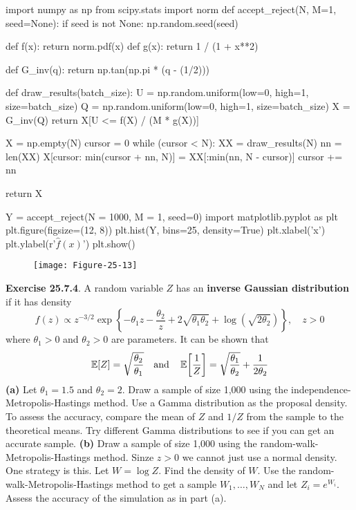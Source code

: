 \begin{python}
import numpy as np
from scipy.stats import norm
def accept_reject(N, M=1, seed=None):
    if seed is not None:
        np.random.seed(seed)
        
    def f(x):
        return norm.pdf(x)
    def g(x):
        return 1 / (1 + x**2)
    
    def G_{i}nv(q):
        return np.tan(np.pi * (q - (1/2)))
        
    def draw_results(batch_size): 
        U = np.random.uniform(low=0, high=1, size=batch_size)
        Q = np.random.uniform(low=0, high=1, size=batch_size)
        X = G_{i}nv(Q)
        return X[U <= f(X) / (M * g(X))]
    
    X = np.empty(N)
    cursor = 0
    while (cursor < N):
        XX = draw_results(N)
        nn = len(XX)
        X[cursor: min(cursor + nn, N)] = XX[:min(nn, N - cursor)]
        cursor += nn
    
    return X
\end{python}

\begin{python}
Y = accept_reject(N = 1000, M = 1, seed=0)
import matplotlib.pyplot as plt
plt.figure(figsize=(12, 8))
plt.hist(Y, bins=25, density=True)
plt.xlabel('x')
plt.ylabel(r'$\hat{f}(x)$')
plt.show()
\end{python}

\begin{figure}[H]
\centering
\texttt{[image: Figure-25-13]}
\end{figure}


\textbf{Exercise 25.7.4}. A random variable \(Z\) has an \textbf{inverse
Gaussian distribution} if it has density
\[
f(z) \propto z^{-3/2}  \exp \left\{ -\theta_{1} z - \frac{\theta_{2}}{z} + 2 \sqrt{\theta_{1} \theta_{2}}  + \log \left( \sqrt{2 \theta_{2}} \right) \right\}, \quad z > 0
\]
where \(\theta_{1} > 0\) and \(\theta_{2} > 0\) are parameters. It can be
shown that
\[
\EXP[Z] = \sqrt{\frac{\theta_{2}}{\theta_{1}}} 
\quad \text{and} \quad
\EXP\left[ \frac{1}{Z} \right] = \sqrt{\frac{\theta_{1}}{\theta_{2}}} + \frac{1}{2 \theta_{2}}
\]
\textbf{(a)} Let \(\theta_{1} = 1.5\) and \(\theta_{2} = 2\). Draw a sample
of size 1,000 using the independence-Metropolis-Hastings method. Use a
Gamma distribution as the proposal density. To assess the accuracy,
compare the mean of \(Z\) and \(1 / Z\) from the sample to the
theoretical means. Try different Gamma distributions to see if you can
get an accurate sample.
\textbf{(b)} Draw a sample of size 1,000 using the
random-walk-Metropolis-Hastings method. Sinze \(z > 0\) we cannot just
use a normal density. One strategy is this. Let \(W = \log Z\). Find the
density of \(W\). Use the random-walk-Metropolis-Hastings method to get
a sample \(W_{1}, \dots, W_N\) and let \(Z_{i} = e^{W_{i}}\). Assess the
accuracy of the simulation as in part (a).

